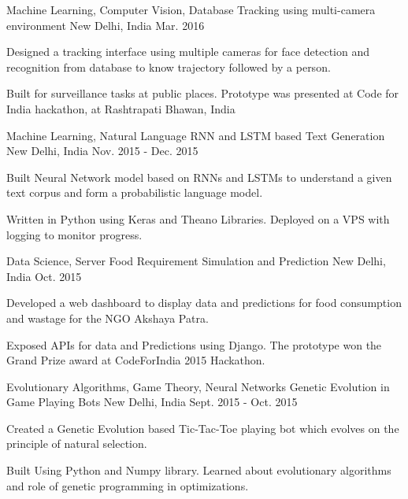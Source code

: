 \begin{cventries}
  \cventry
    {Machine Learning, Computer Vision, Database}
    {Tracking using multi-camera environment}
    {New Delhi, India}
    {Mar. 2016}
    {
      \begin{cvitems}
        \item {Designed a tracking interface using multiple cameras for face detection and recognition from database to know trajectory followed by a person.}
        \item {Built for surveillance tasks at public places. Prototype was presented at Code for India hackathon, at Rashtrapati Bhawan, India}
      \end{cvitems}
    }
  \cventry
    {Machine Learning, Natural Language}
    {RNN and LSTM based Text Generation}
    {New Delhi, India}
    {Nov. 2015 - Dec. 2015}
    {
      \begin{cvitems}
        \item {Built Neural Network model based on RNNs and LSTMs to understand a given text corpus and form a probabilistic language model.}
        \item { Written in Python using Keras and Theano Libraries. Deployed on a VPS with logging to monitor progress.}
      \end{cvitems}
    }
  \cventry
    {Data Science, Server}
    {Food Requirement Simulation and Prediction}
    {New Delhi, India}
    {Oct. 2015}
    {
      \begin{cvitems}
        \item {Developed a web dashboard to display data and predictions for food consumption and wastage for the NGO Akshaya Patra.}
        \item {Exposed APIs for data and Predictions using Django. The prototype won the Grand Prize award at CodeForIndia 2015 Hackathon.}
      \end{cvitems} 
    }
  \cventry
    {Evolutionary Algorithms, Game Theory, Neural Networks}
    {Genetic Evolution in Game Playing Bots}
    {New Delhi, India}
    {Sept. 2015 - Oct. 2015}
    {
      \begin{cvitems}
        \item {Created a Genetic Evolution based Tic-Tac-Toe playing bot which evolves on the principle of natural selection.}
        \item {Built Using Python and Numpy library. Learned about evolutionary algorithms and role of genetic programming in optimizations.}
      \end{cvitems}
}
\end{cventries}

